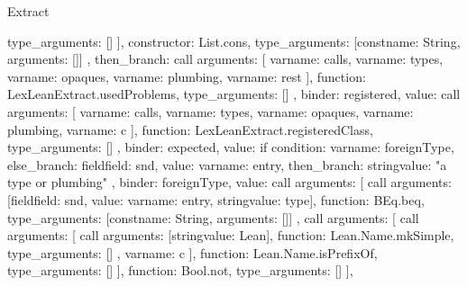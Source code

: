 \begin{lexlean}{Extract}
\begin{toolingmodule}
{{{{{{{{{{{                            type_arguments: []
                          }
                        ],
                        constructor: List.cons,
                        type_arguments: [const{name: String, arguments: []}]
                      },
                      then_branch: call{
                        arguments: [
                          var{name: calls},
                          var{name: types},
                          var{name: opaques},
                          var{name: plumbing},
                          var{name: rest}
                        ],
                        function: LexLeanExtract.usedProblems,
                        type_arguments: []
                      }
                    },
                    binder: registered,
                    value: call{
                      arguments: [
                        var{name: calls},
                        var{name: types},
                        var{name: opaques},
                        var{name: plumbing},
                        var{name: c}
                      ],
                      function: LexLeanExtract.registeredClass,
                      type_arguments: []
                    }
                  },
                  binder: expected,
                  value: if{
                    condition: var{name: foreignType},
                    else_branch: field{field: snd, value: var{name: entry}},
                    then_branch: string{value: "a type or plumbing"}
                  }
                },
                binder: foreignType,
                value: call{
                  arguments: [
                    call{
                      arguments: [field{field: snd, value: var{name: entry}}, string{value: type}],
                      function: BEq.beq,
                      type_arguments: [const{name: String, arguments: []}]
                    },
                    call{
                      arguments: [
                        call{
                          arguments: [
                            call{
                              arguments: [string{value: Lean}],
                              function: Lean.Name.mkSimple,
                              type_arguments: []
                            },
                            var{name: c}
                          ],
                          function: Lean.Name.isPrefixOf,
                          type_arguments: []
                        }
                      ],
                      function: Bool.not,
                      type_arguments: []
                    }
                  ],
}}}}}}}
\end{toolingmodule}
\end{lexlean}
